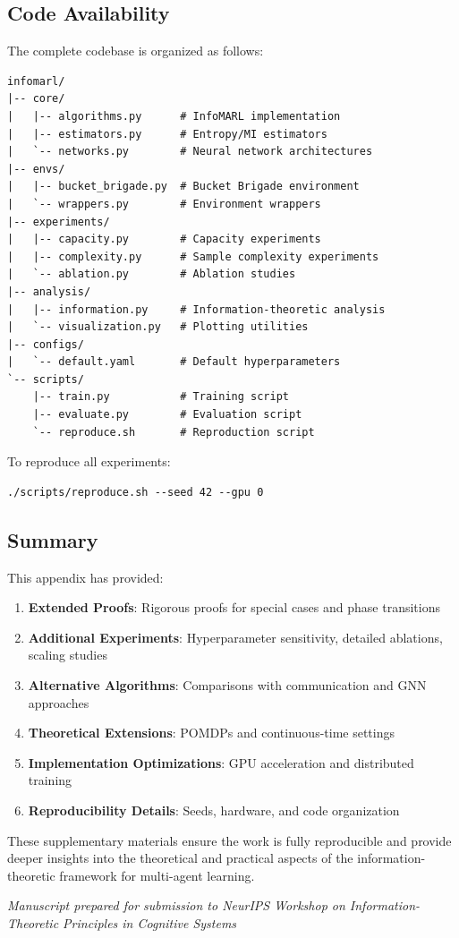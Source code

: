 \documentclass[10pt, letterpaper]{article}
\begin{document}
\subsection{Code Availability}

The complete codebase is organized as follows:

\begin{verbatim}
infomarl/
|-- core/
|   |-- algorithms.py      # InfoMARL implementation
|   |-- estimators.py      # Entropy/MI estimators
|   `-- networks.py        # Neural network architectures
|-- envs/
|   |-- bucket_brigade.py  # Bucket Brigade environment
|   `-- wrappers.py        # Environment wrappers
|-- experiments/
|   |-- capacity.py        # Capacity experiments
|   |-- complexity.py      # Sample complexity experiments
|   `-- ablation.py        # Ablation studies
|-- analysis/
|   |-- information.py     # Information-theoretic analysis
|   `-- visualization.py   # Plotting utilities
|-- configs/
|   `-- default.yaml       # Default hyperparameters
`-- scripts/
    |-- train.py           # Training script
    |-- evaluate.py        # Evaluation script
    `-- reproduce.sh       # Reproduction script
\end{verbatim}

To reproduce all experiments:

\begin{verbatim}
./scripts/reproduce.sh --seed 42 --gpu 0
\end{verbatim}

\subsection{Summary}

This appendix has provided:
\begin{enumerate}
    \item \textbf{Extended Proofs}: Rigorous proofs for special cases and phase transitions
    \item \textbf{Additional Experiments}: Hyperparameter sensitivity, detailed ablations, scaling studies
    \item \textbf{Alternative Algorithms}: Comparisons with communication and GNN approaches
    \item \textbf{Theoretical Extensions}: POMDPs and continuous-time settings
    \item \textbf{Implementation Optimizations}: GPU acceleration and distributed training
    \item \textbf{Reproducibility Details}: Seeds, hardware, and code organization
\end{enumerate}

These supplementary materials ensure the work is fully reproducible and provide deeper insights into the theoretical and practical aspects of the information-theoretic framework for multi-agent learning.

\bigskip

\noindent\emph{Manuscript prepared for submission to NeurIPS Workshop on Information-Theoretic Principles in Cognitive Systems}
\end{document}

